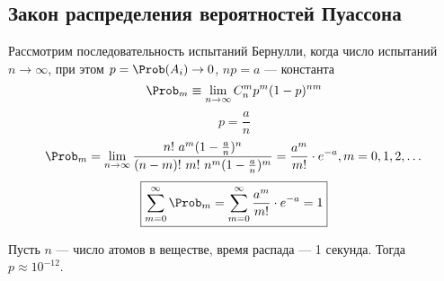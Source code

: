 \subsection{Закон распределения вероятностей Пуассона}
Рассмотрим последовательность испытаний Бернулли, когда число испытаний $n \to \infty$, при этом $p = \Prob(A_i) \to 0$, $np = a$ --- константа
\[
  \Prob_m \equiv \lim_{n \to \infty} C_n^m p^m (1-p)^{nm}
\]
\[ p = \frac{a}{n} \]
\[ \Prob_m = \lim_{n \to \infty} \frac{n!\ a^m (1 - \frac{a}{n})^n}{(n-m)!\ m!\ n^m (1 - \frac{a}{n})^m} = \frac{a^m}{m!} \cdot e^{-a}, m = 0, 1, 2, \dots \]
\[ \boxed{\sum\limits_{m=0}^\infty \Prob_m = \sum\limits_{m=0}^\infty \frac{a^m}{m!} \cdot e^{-a} = 1}\]
\begin{example}
  Пусть $n$ --- число атомов в веществе, время распада --- 1 секунда. Тогда $p \approx 10^{-12}$.
\end{example}

